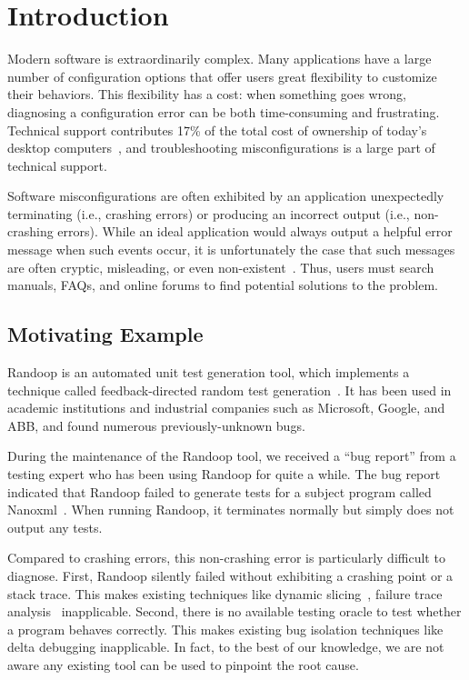 
\section{Introduction}
\label{sec:introduction}

Modern software is extraordinarily complex. Many applications have a large
number of configuration options that offer users great flexibility to
customize their behaviors. This flexibility has a cost: when something
goes wrong, diagnosing a configuration error can be both time-consuming
and frustrating. Technical support contributes 17\% of the total cost of ownership of
today's desktop computers~\cite{confevidence}, and troubleshooting misconfigurations
is a large part of technical support.

Software misconfigurations are often exhibited by an application unexpectedly terminating
(i.e., crashing errors) or producing an incorrect output (i.e., non-crashing errors). While an ideal application would always
output a helpful error message when such events occur, it is unfortunately
the case that such messages are often cryptic, misleading, or
even non-existent~\cite{Yin:2011:ESC, Attariyan:2010:ACT, Hubaux:2012, rangefix}.
Thus, users must search manuals, FAQs, and online forums to find potential
solutions to the problem. %

\subsection{Motivating Example}

Randoop is an automated unit test generation tool, which implements
a technique called feedback-directed random test generation~\cite{randoop}.
It has been used in academic institutions and
industrial companies such as Microsoft, Google,
and ABB, and found numerous previously-unknown bugs.

During the maintenance of the Randoop tool, we received a ``bug report''
from a testing expert who has been using Randoop for quite a while.
The bug report indicated that Randoop failed to generate
tests for a subject program called Nanoxml~\cite{nanoxml}. When running Randoop,
it terminates normally but simply does not output any tests.

Compared to crashing errors, this non-crashing error is particularly difficult to diagnose.
First, Randoop silently failed without exhibiting a crashing point or
a stack trace. This makes existing techniques like dynamic slicing~\cite{Zhang:2003:PDS},
failure trace analysis~\cite{Rabkin:2011:PPC, Attariyan:2010:ACT} inapplicable. Second, there is no
available testing oracle to test whether a program behaves correctly.
This makes existing bug isolation techniques like delta debugging
inapplicable. In fact, to the best of our knowledge, we are not
aware any existing tool can be used to pinpoint the root cause.

